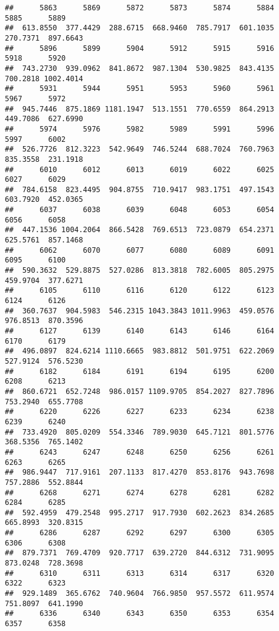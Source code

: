 \documentclass[
]{article}
\begin{document}
\begin{verbatim}
##      5863      5869      5872      5873      5874      5884      5885      5889 
##  613.8550  377.4429  288.6715  668.9460  785.7917  601.1035  270.7371  897.6643 
##      5896      5899      5904      5912      5915      5916      5918      5920 
##  743.2730  939.0962  841.8672  987.1304  530.9825  843.4135  700.2818 1002.4014 
##      5931      5944      5951      5953      5960      5961      5967      5972 
##  945.7446  875.1869 1181.1947  513.1551  770.6559  864.2913  449.7086  627.6990 
##      5974      5976      5982      5989      5991      5996      5997      6002 
##  526.7726  812.3223  542.9649  746.5244  688.7024  760.7963  835.3558  231.1918 
##      6010      6012      6013      6019      6022      6025      6027      6029 
##  784.6158  823.4495  904.8755  710.9417  983.1751  497.1543  603.7920  452.0365 
##      6037      6038      6039      6048      6053      6054      6056      6058 
##  447.1536 1004.2064  866.5428  769.6513  723.0879  654.2371  625.5761  857.1468 
##      6062      6070      6077      6080      6089      6091      6095      6100 
##  590.3632  529.8875  527.0286  813.3818  782.6005  805.2975  459.9704  377.6271 
##      6105      6110      6116      6120      6122      6123      6124      6126 
##  360.7637  904.5983  546.2315 1043.3843 1011.9963  459.0576  976.8513  870.3596 
##      6127      6139      6140      6143      6146      6164      6170      6179 
##  496.0897  824.6214 1110.6665  983.8812  501.9751  622.2069  527.9124  576.5230 
##      6182      6184      6191      6194      6195      6200      6208      6213 
##  860.6721  652.7248  986.0157 1109.9705  854.2027  827.7896  753.2940  655.7708 
##      6220      6226      6227      6233      6234      6238      6239      6240 
##  733.4920  805.0209  554.3346  789.9030  645.7121  801.5776  368.5356  765.1402 
##      6243      6247      6248      6250      6256      6261      6263      6265 
##  986.9447  717.9161  207.1133  817.4270  853.8176  943.7698  757.2886  552.8844 
##      6268      6271      6274      6278      6281      6282      6284      6285 
##  592.4959  479.2548  995.2717  917.7930  602.2623  834.2685  665.8993  320.8315 
##      6286      6287      6292      6297      6300      6305      6306      6308 
##  879.7371  769.4709  920.7717  639.2720  844.6312  731.9095  873.0248  728.3698 
##      6310      6311      6313      6314      6317      6320      6322      6323 
##  929.1489  365.6762  740.9604  766.9850  957.5572  611.9574  751.8097  641.1990 
##      6336      6340      6343      6350      6353      6354      6357      6358 

\end{verbatim}
\end{document}
